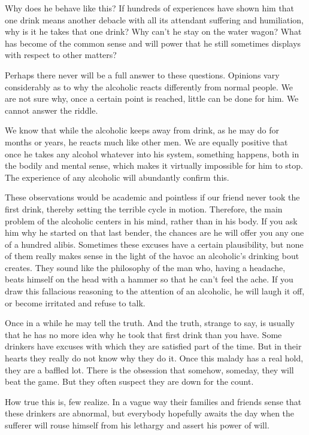\begin{biblechapter}

Why does he behave like this? 
If hundreds of experiences have shown him that one drink means another debacle with all its attendant suffering and humiliation, 
why is it he takes that one drink? 
Why can't he stay on the water wagon? 
What has become of the common sense and will power that he still sometimes displays with respect to other matters?

Perhaps there never will be a full answer to these questions. 
Opinions vary considerably as to why the alcoholic reacts differently from normal people. 
We are not sure why, once a certain point is reached, little can be done for him. 
We cannot answer the riddle.

We know that while the alcoholic keeps away from drink, as he may do for months or years, he reacts much like other men. 
We are equally positive that once he takes any alcohol whatever into his system, something happens, 
both in the bodily and mental sense, 
which makes it virtually impossible for him to stop. 
The experience of any alcoholic will abundantly confirm this.

These observations would be academic and pointless if our friend never took the first drink, thereby setting the terrible cycle in motion. 
Therefore, the main problem of the alcoholic centers in his mind, rather than in his body. 
If you ask him why he started on that last bender, the chances are he will offer you any one of a hundred alibis. 
Sometimes these excuses have a certain plausibility, 
but none of them really makes sense in the light of the havoc an alcoholic's drinking bout creates. 
They sound like the philosophy of the man who, having a headache, beats himself on the head with a hammer so that he can't feel the ache. 
If you draw this fallacious reasoning to the attention of an alcoholic, he will laugh it off, 
or become irritated and refuse to talk.

Once in a while he may tell the truth. 
And the truth, strange to say, is usually that he has no more idea why he took that first drink than you have. 
Some drinkers have excuses with which they are satisfied part of the time. 
But in their hearts they really do not know why they do it. 
Once this malady has a real hold, they are a baffled lot. 
There is the obsession that somehow, someday, they will beat the game. 
But they often suspect they are down for the count.

How true this is, few realize. 
In a vague way their families and friends sense that these drinkers are abnormal, 
but everybody hopefully awaits the day when the sufferer will rouse himself from his lethargy and assert his power of will.
\end{biblechapter}


